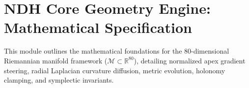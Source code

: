 \documentclass[11pt,fleqn]{article}
\newcommand{\R}{\mathbb{R}}
\newcommand{\M}{\mathcal{M}}
\begin{document}
\section*{NDH Core Geometry Engine: Mathematical Specification}

This module outlines the mathematical foundations for the 80-dimensional Riemannian manifold framework ($\M \subset \R^{80}$), detailing normalized apex gradient steering, radial Laplacian curvature diffusion, metric evolution, holonomy clamping, and symplectic invariants.
\end{document}

